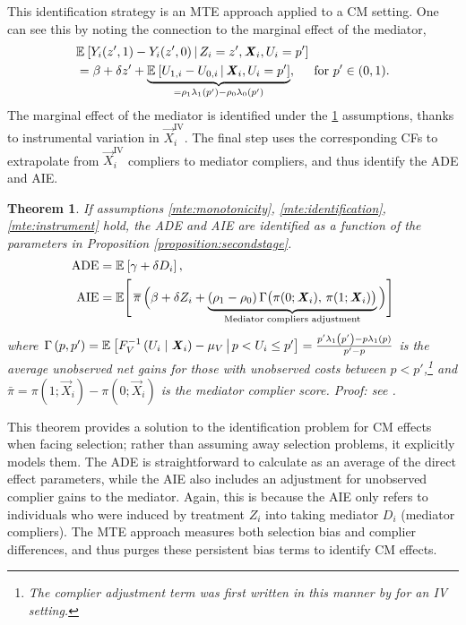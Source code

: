 This identification strategy is an MTE approach \citep{bjorklund1987estimation,heckman2005structural} applied to a CM setting.
One can see this by noting the connection to the marginal effect of the mediator,
\begin{align*}
    & \mathbb{E}_{} \left[ Y_i(z', 1) - Y_i(z', 0) \, \middle\vert \, Z_i = z', \boldsymbol{\mathit{X}}_i, U_i = p' \right] \\
    &= \beta + \delta z' +
    \underbrace{\mathbb{E}_{} \left[ U_{1,i} - U_{0,i} \, \middle\vert \, \boldsymbol{\mathit{X}}_i, U_i = p' \right]}_{
        = \rho_1\lambda_1(p') - \rho_0\lambda_0(p')},
    \;\;\;\; \text{ for } p' \in (0,1).
\end{align*}
The marginal effect of the mediator is identified under the \ref{thm:mte-identification} assumptions, thanks to instrumental variation in $\vec X_i^{\text{IV}}$.
The final step uses the corresponding CFs to extrapolate from $\vec X_i^{\text{IV}}$ compliers to mediator compliers, and thus identify the ADE and AIE.

\newtheorem{theoremMTE}{Theorem}
\renewcommand\thetheoremMTE{MTE-Approach}
\begin{theoremMTE}
    \label{thm:mte-identification}
    If assumptions \ref{mte:monotonicity}, \ref{mte:identification}, \ref{mte:instrument} hold, the ADE and AIE are identified as a function of the parameters in Proposition \ref{proposition:secondstage}.
    \begin{align*}
    \text{ADE}
        &= \mathbb{E}_{} \left[ \gamma + \delta D_i \right], \\
    \text{AIE}
        &= \mathbb E \Bigg[ \, \overline{\pi} \,
            \Big( \beta +  \delta Z_i +
                \underbrace{ (\rho_1 - \rho_0) \,
                \Gamma \big(\pi(0; \boldsymbol{\mathit{X}}_i), \, \pi(1; \boldsymbol{\mathit{X}}_i) \big)}_{
                    \text{Mediator compliers adjustment}} \Big) \Bigg]
    \end{align*}
    where $\Gamma\left(p,p'\right) 
    = \mathbb{E}_{} \left[  F_V^{-1}\left( U_i \mid \boldsymbol{\mathit{X}}_i \right) - \mu_V \, \middle\vert \, p < U_i \leq p' \right]
    = \frac{p'\lambda_1\left(p'\right) - p\lambda_1\left(p\right)}{p' - p}$ is the average unobserved net gains for those with unobserved costs between $p < p'$,\footnote{
        The complier adjustment term was first written in this manner by \cite{kline2019heckits} for an IV setting.
    } and $\bar\pi = \pi(1; \vec X_i) - \pi(0; \vec X_i)$ is the mediator complier score.
    Proof: see .
\end{theoremMTE}

This theorem provides a solution to the identification problem for CM effects when facing selection;
rather than assuming away selection problems, it explicitly models them.
The ADE is straightforward to calculate as an average of the direct effect parameters, while the AIE also includes an adjustment for unobserved complier gains to the mediator.
Again, this is because the AIE only refers to individuals who were induced by treatment $Z_i$ into taking mediator $D_i$ (mediator compliers).
The MTE approach measures both selection bias and complier differences, and thus purges these persistent bias terms to identify CM effects.


